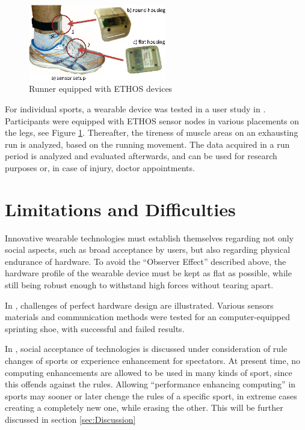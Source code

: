 \documentclass[sigconf]{acmart}
\begin{document}
		\begin{figure}[t]\centering
			\includegraphics[width=6cm]{Images/Figure1.png}
			\caption{Runner equipped with ETHOS devices \cite{InToTheWoods}}
			\label{fig:woods}
		\end{figure}
	
		\par For individual sports, a wearable device was tested in a user study in \cite{InToTheWoods}. Participants were equipped with ETHOS sensor nodes in various placements on the legs, see Figure \ref{fig:woods}. Thereafter, the tireness of muscle areas on an exhausting run is analyzed, based on the running movement. The data acquired in a run period is analyzed and evaluated afterwards, and can be used for research purposes or, in case of injury, doctor appointments.
		  
	
	\section{Limitations and Difficulties}
	Innovative wearable technologies must establish themselves regarding not only social aspects, such as broad acceptance by users, but also regarding physical endurance of hardware. To avoid the ``Observer Effect'' described above, the hardware profile of the wearable device must be kept as flat as possible, while still being robust enough to withstand high forces without tearing apart. 
	\par In \cite{SportSensing}, challenges of perfect hardware design are illustrated. Various sensors materials and communication methods were tested for an computer-equipped sprinting shoe, with successful and failed results. 
	
	 In \cite{PervasiveComputing}, social acceptance of technologies is discussed under consideration of rule changes of sports or experience enhancement for spectators. At present time, no computing enhancements are allowed to be used in many kinds of sport, since this offends against the rules. Allowing ``performance enhancing computing'' in sports may sooner or later chenge the rules of a specific sport, in extreme cases creating a completely new one, while erasing the other. This will be further discussed in section \ref{sec:Discussion}
	 
\end{document}
